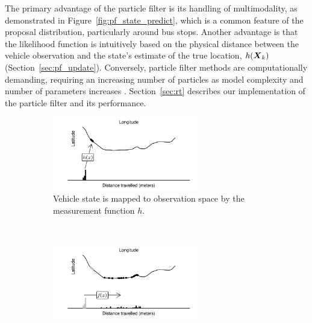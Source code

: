 The primary advantage of the particle filter is its handling of multimodality,
as demonstrated in Figure~\ref{fig:pf_state_predict},
which is a common feature of the proposal distribution, particularly around bus stops.
Another advantage is that the likelihood function is intuitively based
on the physical distance between the vehicle observation and the state's
estimate of the true location, $h(\mbox{$\boldsymbol{X}$}_k)$ (Section~\ref{sec:pf_update}).
Conversely, particle filter methods are computationally demanding,
requiring an increasing number of particles as model complexity and
number of parameters increases \citep{Carpenter_1999}.
Section~\ref{sec:rt} describes our implementation of the particle filter
and its \rt performance.



\begin{figure}[p]
    \centering
    \begin{subfigure}[t]{0.9\textwidth}
        \centering
        \includegraphics[width=0.7\textwidth]{figures/03_particle_filter_1.pdf}
        \caption{
            Vehicle state is mapped to observation space by the
            measurement function $h$.   
        }
        \label{fig:pf_state_prev}
    \end{subfigure}\\
    \begin{subfigure}[t]{0.9\textwidth}
        \centering
        \includegraphics[width=0.7\textwidth]{figures/03_particle_filter_2.pdf}

\end{subfigure}
\end{figure}
